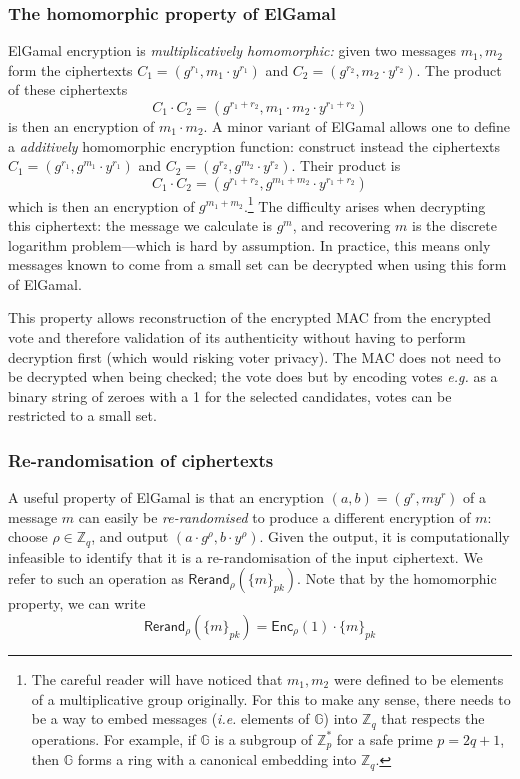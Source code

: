 \documentclass[12pt,a4paper]{article}
\theoremstyle{definition}
\newcommand{\ie}{\textit{i.e. }}
\newcommand{\eg}{\textit{e.g. }}
\begin{document}
\subsubsection{The homomorphic property of ElGamal}
ElGamal encryption is \textit{multiplicatively homomorphic:} given two messages $m_1, m_2$ form the ciphertexts $C_1 = (g^{r_1}, m_1\cdot y^{r_1})$ and $C_2 = (g^{r_2}, m_2\cdot y^{r_2})$. The product of these ciphertexts
$$C_1\cdot C_2 = (g^{r_1+r_2}, m_1\cdot m_2\cdot y^{r_1+r_2})$$
is then an encryption of $m_1\cdot m_2$. A minor variant of ElGamal allows one to define a \textit{additively} homomorphic encryption function: construct instead the ciphertexts $C_1 = (g^{r_1}, g^{m_1}\cdot y^{r_1})$ and $C_2 = (g^{r_2}, g^{m_2}\cdot y^{r_2})$. Their product is
$$C_1\cdot C_2 = (g^{r_1+r_2}, g^{m_1 + m_2}\cdot y^{r_1+r_2})$$
which is then an encryption of $g^{m_1 + m_2}$.\footnote{The careful reader will have noticed that $m_1, m_2$ were defined to be elements of a multiplicative group originally. For this to make any sense, there needs to be a way to embed messages (\ie elements of $\mathbb{G}$) into $\mathbb{Z}_q$ that respects the operations. For example, if $\mathbb{G}$ is a subgroup of $\mathbb{Z}^*_p$ for a safe prime $p=2q + 1$, then $\mathbb{G}$ forms a ring with a canonical embedding into $\mathbb{Z}_q$.} The difficulty arises when decrypting this ciphertext: the message we calculate is $g^m$, and recovering $m$ is the discrete logarithm problem---which is hard by assumption. In practice, this means only messages known to come from a small set can be decrypted when using this form of ElGamal.

This property allows reconstruction of the encrypted MAC from the encrypted vote and therefore validation of its authenticity without having to perform decryption first (which would risking voter privacy). The MAC does not need to be decrypted when being checked; the vote does but by encoding votes \eg as a binary string of zeroes with a 1 for the selected candidates, votes can be restricted to a small set.

\subsubsection{Re-randomisation of ciphertexts}
A useful property of ElGamal is that an encryption $(a, b)=(g^r, my^r)$ of a message $m$ can easily be \textit{re-randomised} to produce a different encryption of $m$: choose $\rho\in\mathbb{Z}_q$, and output $(a\cdot g^\rho, b\cdot y^\rho)$. Given the output, it is computationally infeasible to identify that it is a re-randomisation of the input ciphertext. We refer to such an operation as $\mathsf{Rerand}_\rho(\{m\}_{pk})$. Note that by the homomorphic property, we can write
$$\mathsf{Rerand}_\rho(\{m\}_{pk})=\mathsf{Enc}_{\rho}(1)\cdot\{m\}_{pk}$$
\end{document}
